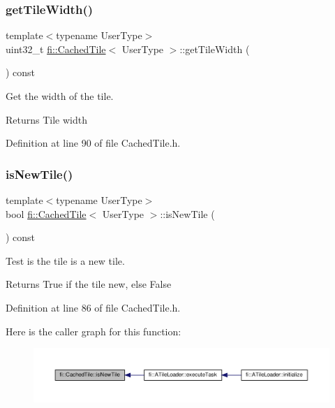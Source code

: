 \subsubsection{\texorpdfstring{get\+Tile\+Width()}{getTileWidth()}}
{\footnotesize\ttfamily template$<$typename User\+Type$>$ \\
uint32\+\_\+t \hyperlink{classfi_1_1CachedTile}{fi\+::\+Cached\+Tile}$<$ User\+Type $>$\+::get\+Tile\+Width (\begin{DoxyParamCaption}{ }\end{DoxyParamCaption}) const\hspace{0.3cm}{\ttfamily [inline]}}



Get the width of the tile. 

\begin{DoxyReturn}{Returns}
Tile width 
\end{DoxyReturn}


Definition at line 90 of file Cached\+Tile.\+h.

\mbox{\label{classfi_1_1CachedTile_ab2d77a5ac2fd2c68038fbce58a4ffb1f}} 
\subsubsection{\texorpdfstring{is\+New\+Tile()}{isNewTile()}}
{\footnotesize\ttfamily template$<$typename User\+Type$>$ \\
bool \hyperlink{classfi_1_1CachedTile}{fi\+::\+Cached\+Tile}$<$ User\+Type $>$\+::is\+New\+Tile (\begin{DoxyParamCaption}{ }\end{DoxyParamCaption}) const\hspace{0.3cm}{\ttfamily [inline]}}



Test is the tile is a new tile. 

\begin{DoxyReturn}{Returns}
True if the tile new, else False 
\end{DoxyReturn}


Definition at line 86 of file Cached\+Tile.\+h.

Here is the caller graph for this function\+:
\nopagebreak
\begin{figure}[H]
\begin{center}
\leavevmode
\includegraphics[width=350pt]{d0/dbc/classfi_1_1CachedTile_ab2d77a5ac2fd2c68038fbce58a4ffb1f_icgraph}
\end{center}
\end{figure}
\mbox{\label{classfi_1_1CachedTile_a996218bd6a061692288167946515b93b}} 
